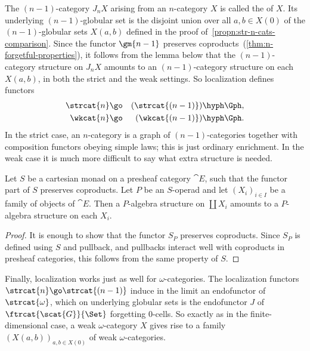 The $(n-1)$-category $J_n X$ arising from an $n$-category $X$ is called the
%
%
%
of $X$.  Its underlying $(n-1)$-globular set is the
disjoint union over all $a, b \in X(0)$ of the $(n-1)$-globular sets
$X(a,b)$ defined in the proof of~\ref{propn:str-n-cats-comparison}.  Since
the functor $\gm{n-1}$ preserves
coproducts~(\ref{thm:n-forgetful-properties}),%
%
%
%
%
it follows from the lemma
below that the $(n-1)$-category structure on $J_n X$ amounts to an
$(n-1)$-category structure on each $X(a,b)$, in both the strict and the
weak settings.  So localization defines functors
%
\begin{eqnarray*}
\strcat{n}      &\go        &(\strcat{(n-1)})\hyph\Gph,        \\
\wkcat{n}       &\go        &(\wkcat{(n-1)})\hyph\Gph.         
\end{eqnarray*}
%
In the strict case, an $n$-category is a graph of $(n-1)$-categories
together with composition functors obeying simple laws; this is just
ordinary enrichment.%
%
%
 In the weak case it is much more difficult to say
what extra structure is needed.

\begin{lemma}  \label{lemma:coprod-algs}
Let $S$ be a cartesian monad on a presheaf category $\cat{E}$, such that
the functor part of $S$ preserves coproducts.  Let $P$ be an $S$-operad
and let $(X_i)_{i\in I}$ be a family of objects of $\cat{E}$.  Then a
$P$-algebra structure on $\coprod X_i$ amounts to a $P$-algebra structure
on each $X_i$.  
\end{lemma}
%
\begin{proof}
It is enough to show that the functor $S_P$ preserves coproducts.  Since
$S_P$ is defined using $S$ and pullback, and pullbacks interact well with
coproducts in presheaf categories, this follows from the same property of
$S$.
\done
\end{proof}

Finally, localization%
%
%
works just as well for $\omega$-categories.  The
localization functors $\strcat{n} \go \strcat{(n-1)}$ induce in the limit
an endofunctor of $\strcat{\omega}$, which on underlying globular sets is
the endofunctor $J$ of $\ftrcat{\scat{G}}{\Set}$ forgetting $0$-cells.  So
exactly as in the finite-dimensional case, a weak $\omega$-category $X$
gives rise to a family $(X(a,b))_{a, b \in X(0)}$ of weak
$\omega$-categories.%
%
%







